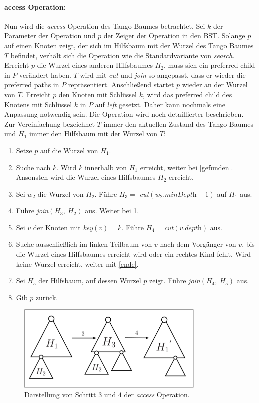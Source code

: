 \documentclass[a4paper,12pt]{article}
\begin{document}
\paragraph{access Operation:}
Nun wird die \textit{access} Operation des Tango Baumes betrachtet. Sei $k$ der Parameter der Operation und $p$ der Zeiger der Operation in den BST. Solange $p$ auf einen Knoten zeigt, der sich im Hilfsbaum mit der Wurzel des Tango Baumes $T$ befindet, verhält sich die Operation wie die Standardvariante von \textit{search}. Erreicht $p$ die Wurzel eines anderen Hilfsbaumes $H_2$, muss sich ein preferred child in $P$ verändert haben. $T$ wird mit \textit{cut} und \textit{join} so angepasst, dass er wieder die preferred paths in $P$ repräsentiert. Anschließend startet $p$ wieder an der Wurzel von $T$. Erreicht $p$ den Knoten mit Schlüssel $k$, wird das preferred child des Knotens mit Schlüssel $k$ in $P$ auf \textit{left} gesetzt. Daher kann nochmals eine Anpassung notwendig sein. Die Operation wird noch detaillierter beschrieben. Zur Vereinfachung bezeichnet $T$ immer den aktuellen Zustand des Tango Baumes und $H_1$ immer den Hilfsbaum mit der Wurzel von $T$:
\begin{enumerate}
	\item Setze $p$ auf die Wurzel von $H_1$.
	\item Suche nach $k$. Wird $k$ innerhalb von $H_1$ erreicht, weiter bei \ref{gefunden}. Ansonsten wird die Wurzel eines Hilfsbaumes $H_2$ erreicht.
	\item Sei $w_2$ die Wurzel von $H_2$. Führe $H_3 =$ \textit{cut}$\left(w_2.\textit{minDepth} - 1\right)$ auf $H_1$ aus.
	\item Führe \textit{join}$\left(H_3, ~H_2\right)$ aus. Weiter bei 1.
	\item \label{gefunden} Sei $v$ der Knoten mit \textit{key}$\left(v\right) = k$. Führe $H_4=$\textit{cut}$ \left(v.\textit{depth}\right)$ aus. 
	\item Suche ausschließlich im linken Teilbaum von $v$ nach dem Vorgänger von $v$, bis die Wurzel eines Hilfsbaumes erreicht wird oder ein rechtes Kind fehlt. Wird keine Wurzel erreicht, weiter mit \ref{ende}.
	\item Sei $H_5$ der Hilfsbaum, auf dessen Wurzel $p$ zeigt. Führe \textit{join}$\left(H_4, ~H_5\right)$ aus.
	\item \label{ende} Gib $p$ zurück.
\end{enumerate}
\begin{figure}[H]
	\centering
	\includegraphics[width=0.8\textwidth]{Medien/Tango/cutJoin}
	\caption{Darstellung von Schritt $3$ und $4$ der \textit{access} Operation. }
	\label{fig:cutJoin}
\end{figure}
\end{document}
